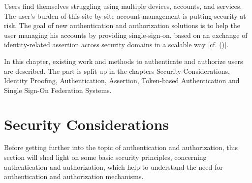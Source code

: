 Users find themselves struggling using multiple devices, accounts, and services. The user's burden of this site-by-site account management is putting security at risk. The goal of new authentication and authorization solutions is to help the user managing his accounts by providing single-sign-on, based on an exchange of identity-related assertion across security domains in a scalable way [cf. (\cite{Corre:2017:WHI})].  

In this chapter, existing work and methods to authenticate and authorize users are described. The part is split up in the chapters Security Considerations, Identity Proofing, Authentication, Assertion, Token-based Authentication and Single Sign-On Federation Systems.


\section{Security Considerations}
\label{securityConsiderations}

Before getting further into the topic of authentication and authorization, this section will shed light on some basic security principles, concerning authentication and authorization, which help to understand the need for authentication and authorization mechanisms. 

